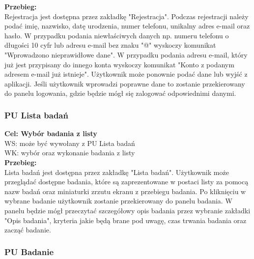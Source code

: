 \documentclass[12pt, letterpaper]{article}
\begin{document}
		\textbf{Przebieg:}\\
		Rejestracja jest dostępna przez zakładkę "Rejestracja". Podczas rejestracji należy podać imię, nazwisko, datę urodzenia, numer telefonu, unikalny adres e-mail oraz hasło. W przypadku podania niewłaściwych danych np. numeru telefonu o długości 10 cyfr lub adresu e-mail bez znaku "@" wyskoczy komunikat "Wprowadzono nieprawidłowe dane". W przypadku podania adresu e-mail, który już jest przypisany do innego konta wyskoczy komunikat "Konto z podanym adresem e-mail już istnieje". Użytkownik może ponownie podać dane lub wyjść z aplikacji. Jeśli użytkownik wprowadzi poprawne dane to zostanie przekierowany do panelu logowania, gdzie będzie mógł się zalogować odpowiednimi danymi. \\
		
		
		\subsubsection{PU Lista badań}
		
		\quad
		
		\textbf{Cel: Wybór badania z listy}\\
		
		WS: może być wywołany z PU Lista badań\\
		
		WK: wybór oraz wykonanie badania z listy\\
		
		\textbf{Przebieg:}\\
		Lista badań jest dostępna przez zakładkę "Lista badań". Użytkownik może przeglądać dostępne badania, które są zaprezentowane w postaci listy za pomocą nazw badań oraz miniaturki zrzutu ekranu z przebiegu badania. Po kliknięciu w wybrane badanie użytkownik zostanie przekierowany do panelu badania. W panelu będzie mógł przeczytać szczegółowy opis badania przez wybranie zakładki "Opis badania", kryteria jakie będą brane pod uwagę, czas trwania badania oraz zacząć badanie. \\
		
		
		\subsubsection{PU Badanie}
		
\end{document}
